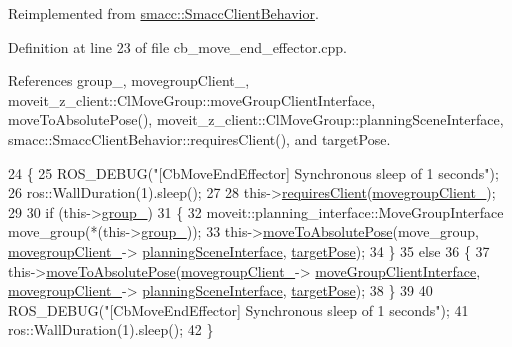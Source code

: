 Reimplemented from \hyperlink{classsmacc_1_1SmaccClientBehavior_a7962382f93987c720ad432fef55b123f}{smacc\+::\+Smacc\+Client\+Behavior}.



Definition at line 23 of file cb\+\_\+move\+\_\+end\+\_\+effector.\+cpp.



References group\+\_\+, movegroup\+Client\+\_\+, moveit\+\_\+z\+\_\+client\+::\+Cl\+Move\+Group\+::move\+Group\+Client\+Interface, move\+To\+Absolute\+Pose(), moveit\+\_\+z\+\_\+client\+::\+Cl\+Move\+Group\+::planning\+Scene\+Interface, smacc\+::\+Smacc\+Client\+Behavior\+::requires\+Client(), and target\+Pose.


\begin{DoxyCode}
24 \{
25     ROS\_DEBUG(\textcolor{stringliteral}{"[CbMoveEndEffector] Synchronous sleep of 1 seconds"});
26     ros::WallDuration(1).sleep();
27 
28     this->\hyperlink{classsmacc_1_1SmaccClientBehavior_a917f001e763a1059af337bf4e164f542}{requiresClient}(\hyperlink{classmoveit__z__client_1_1CbMoveEndEffector_af62a434c16849885a085e30b8ae70e00}{movegroupClient\_});
29 
30     \textcolor{keywordflow}{if} (this->\hyperlink{classmoveit__z__client_1_1CbMoveEndEffector_ab2d23ae054dbc0c2a5f3e6bbc84e07dd}{group\_})
31     \{
32         moveit::planning\_interface::MoveGroupInterface move\_group(*(this->\hyperlink{classmoveit__z__client_1_1CbMoveEndEffector_ab2d23ae054dbc0c2a5f3e6bbc84e07dd}{group\_}));
33         this->\hyperlink{classmoveit__z__client_1_1CbMoveEndEffector_a4b77954562c23ba6d0aa0f9c805dfd8d}{moveToAbsolutePose}(move\_group, \hyperlink{classmoveit__z__client_1_1CbMoveEndEffector_af62a434c16849885a085e30b8ae70e00}{movegroupClient\_}->
      \hyperlink{classmoveit__z__client_1_1ClMoveGroup_a21c879b2683286aa21ce68f40195b4b5}{planningSceneInterface}, \hyperlink{classmoveit__z__client_1_1CbMoveEndEffector_abea9c6077733077baced34c6098c6140}{targetPose});
34     \}
35     \textcolor{keywordflow}{else}
36     \{
37         this->\hyperlink{classmoveit__z__client_1_1CbMoveEndEffector_a4b77954562c23ba6d0aa0f9c805dfd8d}{moveToAbsolutePose}(\hyperlink{classmoveit__z__client_1_1CbMoveEndEffector_af62a434c16849885a085e30b8ae70e00}{movegroupClient\_}->
      \hyperlink{classmoveit__z__client_1_1ClMoveGroup_af86e046b837be0ef4afa9893d8808f20}{moveGroupClientInterface}, \hyperlink{classmoveit__z__client_1_1CbMoveEndEffector_af62a434c16849885a085e30b8ae70e00}{movegroupClient\_}->
      \hyperlink{classmoveit__z__client_1_1ClMoveGroup_a21c879b2683286aa21ce68f40195b4b5}{planningSceneInterface}, \hyperlink{classmoveit__z__client_1_1CbMoveEndEffector_abea9c6077733077baced34c6098c6140}{targetPose});
38     \}
39     
40     ROS\_DEBUG(\textcolor{stringliteral}{"[CbMoveEndEffector] Synchronous sleep of 1 seconds"});
41     ros::WallDuration(1).sleep();
42 \}
\end{DoxyCode}
